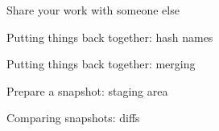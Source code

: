 \documentclass[english]{slides}
\begin{document}
\begin{frame}{Share your work with someone else}
\end{frame}

\begin{frame}{Putting things back together: hash names}
\end{frame}

\begin{frame}{Putting things back together: merging}
\end{frame}

\begin{frame}{Prepare a snapshot: staging area}
\end{frame}

\begin{frame}{Comparing snapshots: diffs}
\end{frame}
\end{document}
